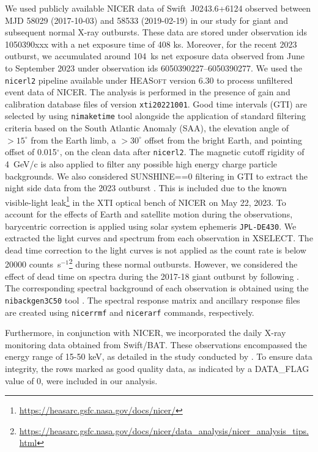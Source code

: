 \documentclass[twocolumn,trackchanges]{aastex631}
\begin{document}
We used publicly available NICER data of Swift~J0243.6+6124 observed between MJD 58029 (2017-10-03) and 58533 (2019-02-19) in our study for giant and subsequent normal X-ray outbursts. These data are stored under observation ids 1050390xxx  with a net exposure time of 408 ks. Moreover, for the recent 2023 outburst, we accumulated around 104~ks net exposure data observed from June to September 2023 under observation ids 6050390227--6050390277. We used the {\tt nicerl2} pipeline available under \textsc{HEASoft} version 6.30 to process unfiltered event data of NICER. The analysis is performed in the presence of gain and calibration database files of version \texttt{xti20221001}. Good time intervals (GTI) are selected by using \texttt{nimaketime} tool alongside the application of standard filtering criteria based on the South Atlantic Anomaly (SAA), the elevation angle of $>15^\circ$ from the Earth limb, a $>30^\circ$ offset from the bright Earth, and pointing offset of 0.015$^\circ$, on the clean data after {\tt nicerl2}. The magnetic cutoff rigidity of 4~GeV/c is also applied to filter any possible high energy charge particle backgrounds. We also considered SUNSHINE==0 filtering in GTI to extract the night side data from the 2023 outburst \citep{Ng2023ATel16121....1N}. This is included due to the known visible-light leak\footnote{\url{https://heasarc.gsfc.nasa.gov/docs/nicer/}}  in the XTI optical bench of NICER on May 22, 2023. To account for the effects of Earth and satellite motion during the observations, barycentric correction is applied using solar system ephemeris \texttt{JPL-DE430}. We extracted the light curves and spectrum from each observation in \textsc{XSELECT}. The dead time correction to the light curves is not applied as the count rate is below 20000 counts~s$^{-1}$\footnote{\url{https://heasarc.gsfc.nasa.gov/docs/nicer/data_analysis/nicer_analysis_tips.html}} during these normal outbursts. However, we considered the effect of dead time on spectra during the 2017-18 giant outburst by following  \citet{2018ApJ...863....9W}.  The corresponding spectral background of each observation is obtained using the {\tt nibackgen3C50} tool \citep{2022AJ....163..130R}. The spectral response matrix and ancillary response files are created using {\tt nicerrmf} and {\tt nicerarf} commands, respectively. 


Furthermore, in conjunction with NICER, we incorporated the daily X-ray monitoring data obtained from Swift/BAT. These observations encompassed the energy range of 15-50 keV, as detailed in the study conducted by \citet{2013ApJS..209...14K}. To ensure data integrity, the rows marked as good quality data, as indicated by a DATA\_FLAG value of 0, were included in our analysis.
\end{document}
